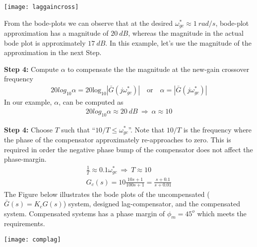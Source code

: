 \documentclass[twoside]{article}
\begin{document}
     \begin{center}
 \begin{minipage}[h]{\linewidth}
     \begin{center}
       \texttt{[image: laggaincross]}
     \end{center}
 \end{minipage}
     \end{center}
     
From the bode-plots we can observe that 
at the desired  $\omega_{gc}^* \approx 1 \ rad/s$,
bode-plot approximation has a magnitude of
$20 \ dB$, whereas the magnitude in the actual
bode plot is approximately $17 \ dB$. In this example,
let's use the magnitude of the approximation in the
next Step.

\textbf{Step 4:} Compute $\alpha$ to compensate the 
the magnitude at the new-gain crossover frequency
%
\begin{align*} 
  20 log_{10} \alpha =  20 \mathrm{log}_{10} |\bar{G}(j  \omega_{gc}^*) |
  	\quad \mathrm{or} \quad
     \alpha = | \bar{G}(j  \omega_{gc}^*) |
\end{align*}
%
In our example, $\alpha$, can be computed as
%
\begin{align*} 
	20 log_{10} \alpha \approx 20 \ dB
	\ \Rightarrow \ \alpha \approx 10
\end{align*}
%

\textbf{Step 4:} Choose $T$ such that ``$10/T \leq \omega_{gc}^*$''.
Note that $10/T$ is the frequency where the phase of the compensator
approximately re-approaches to zero.
This is required in order the
          negative phase bump of the compensator does not affect the
          phase-margin. 
%
\begin{align*} 
	\frac{1}{T} \approx 0.1 \omega_{gc}^*
		\ \Rightarrow \ T \approx 10
		\\	
G_c(s) = 10 \frac{10 s + 1}{100 s + 1} = \frac{s + 0.1}{s + 0.01}
\end{align*}
%
The Figure below illustrates the bode plots of 
the uncompensated ($\bar{G}(s) = K_c G(s)$) system,
designed lag-compensator, and the compensated system. 
Compensated systems has a phase margin of $\phi_m = 45^o$
which meets the requirements.

     \begin{center}
 \begin{minipage}[h]{\linewidth}
     \begin{center}
       \texttt{[image: complag]}
     \end{center}
 \end{minipage}
     \end{center}
\end{document}
